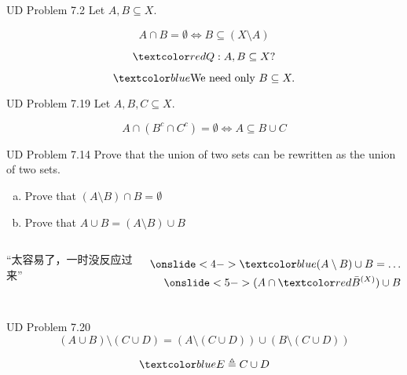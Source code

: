 \begin{frame}
  \begin{exampleblock}{UD Problem 7.2}
    Let $A, B \subseteq X$.

    \[
      A \cap B = \emptyset \iff B \subseteq (X \setminus A)
    \]
  \end{exampleblock}

  \pause
  \[
    \red{Q: A, B \subseteq X?}
  \]

  \pause
  \[
    \blue{\text{We need only } B \subseteq X.}
  \]

  \pause
  \begin{exampleblock}{UD Problem 7.19}
    Let $A, B, C \subseteq X$.

    \[
      A \cap (B^{c} \cap C^{c}) = \emptyset \iff A \subseteq B \cup C
    \]
  \end{exampleblock}
\end{frame}

\begin{frame}{}
  \begin{exampleblock}{UD Problem 7.14}
    Prove that the union of two sets can be rewritten as the union of two  sets.
    \begin{enumerate}[(a)]
      \item Prove that $(A \setminus B) \cap B = \emptyset$
      \item Prove that $A \cup B = (A \setminus B) \cup B$
    \end{enumerate}
  \end{exampleblock}

  \vspace{0.30cm}
  \begin{columns}
      \pause
      \vspace{-0.60cm}
      \begin{center}
	{\footnotesize ``太容易了，一时没反应过来''}
      \end{center}
      \begin{align*}
	\onslide<4->{\blue{(A \setminus B) \cup B = \ldots}} \\
	\onslide<5->{(A \cap \red{\bar{B}^{(X)}}) \cup B}
      \end{align*}
  \end{columns}

\end{frame}

\begin{frame}
  \begin{exampleblock}{UD Problem 7.20}
    \[
      (A \cup B) \setminus (C \cup D) = (A \setminus (C \cup D)) \cup (B \setminus (C \cup D))
    \]
  \end{exampleblock}

  \pause
  \[
    \blue{E \triangleq C \cup D}
  \]
\end{frame}
